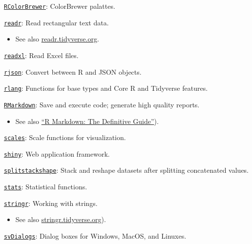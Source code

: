 \documentclass[
]{book}
\providecommand{\tightlist}{%
  \setlength{\itemsep}{0pt}\setlength{\parskip}{0pt}}
\begin{document}
\href{https://CRAN.R-project.org/package=RColorBrewer}{\texttt{RColorBrewer}}: ColorBrewer palattes.

\href{https://CRAN.R-project.org/package=readr}{\texttt{readr}}: Read rectangular text data.

\begin{itemize}
\tightlist
\item
  See also \href{https://readr.tidyverse.org/}{readr.tidyverse.org}.
\end{itemize}

\href{https://CRAN.R-project.org/package=readxl}{\texttt{readxl}}: Read Excel files.

\href{https://CRAN.R-project.org/package=rjson}{\texttt{rjson}}: Convert between R and JSON objects.

\href{https://CRAN.R-project.org/package=rlang}{\texttt{rlang}}: Functions for base types and Core R and Tidyverse features.

\href{https://CRAN.R-project.org/package=rmarkdown}{\texttt{RMarkdown}}: Save and execute code; generate high quality reports.

\begin{itemize}
\tightlist
\item
  See also \href{https://bookdown.org/yihui/rmarkdown/}{``R Markdown: The Definitive Guide''}).
\end{itemize}

\href{https://CRAN.R-project.org/package=scales}{\texttt{scales}}: Scale functions for visualization.

\href{https://CRAN.R-project.org/package=shiny}{\texttt{shiny}}: Web application framework.

\href{https://CRAN.R-project.org/package=splitstackshape}{\texttt{splitstackshape}}: Stack and reshape datasets after splitting concatenated values.

\href{https://www.rdocumentation.org/packages/stats/versions/3.5.1}{\texttt{stats}}: Statistical functions.

\href{https://CRAN.R-project.org/package=stringr}{\texttt{stringr}}: Working with strings.

\begin{itemize}
\tightlist
\item
  See also \href{https://stringr.tidyverse.org/}{stringr.tidyverse.org}).
\end{itemize}

\href{https://CRAN.R-project.org/package=svDialogs}{\texttt{svDialogs}}: Dialog boxes for Windows, MacOS, and Linuxes.
\end{document}
